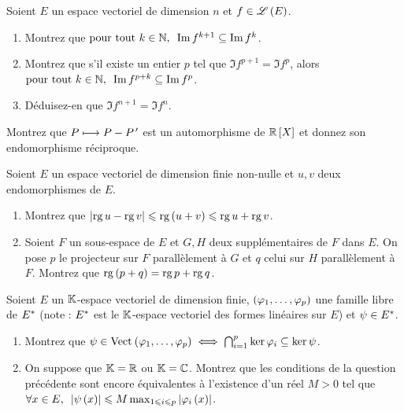 \begin{exo}
Soient \(E\) un espace vectoriel de dimension \(n\) et \(f\in\mathscr{L}\left(E\right)\).

\begin{enumerate}
    \item Montrez que \(\quantifs{\tpt k\in\N}\Im f^{k+1}\subset\Im f^k\). \\
    \item Montrez que s'il existe un entier \(p\) tel que \(\Im f^{p+1}=\Im f^p\), alors \(\quantifs{\tpt k\in\N}\Im f^{p+k}\subset\Im f^p\). \\
    \item Déduisez-en que \(\Im f^{n+1}=\Im f^n\).
\end{enumerate}
\end{exo}



\begin{exo}
Montrez que \(P\longmapsto P-P^{\,\prime}\) est un automorphisme de \(\poly[\R]\) et donnez son endomorphisme réciproque.
\end{exo}



\begin{exo}
Soient \(E\) un espace vectoriel de dimension finie non-nulle et \(u,v\) deux endomorphismes de \(E\).

\begin{enumerate}
    \item Montrez que \(\left\lvert\operatorname{rg} u-\operatorname{rg} v\right\rvert\leqslant\operatorname{rg}\left(u+v\right)\leqslant\operatorname{rg} u+\operatorname{rg} v\). \\
    \item Soient \(F\) un sous-espace de \(E\) et \(G,H\) deux supplémentaires de \(F\) dans \(E\). On pose \(p\) le projecteur sur \(F\) parallèlement à \(G\) et \(q\) celui sur \(H\) parallèlement à \(F\). Montrez que \(\operatorname{rg}\left(p+q\right)=\operatorname{rg} p+\operatorname{rg} q\).
\end{enumerate}
\end{exo}



\begin{exo}
Soient \(E\) un \(\mathbb{K}\)-espace vectoriel de dimension finie, \(\left(\varphi_1,\dots,\varphi_p\right)\) une famille libre de \(E^{*}\) (note : \(E^{*}\) est le \(\mathbb{K}\)-espace vectoriel des formes linéaires sur \(E\)) et \(\psi\in E^{*}\).

\begin{enumerate}
    \item Montrez que \(\psi\in\Vect{\phi_1,\dots,\phi_p}\ssi\biginter_{i=1}^p\ker\phi_i\subset\ker\psi\). \\
    \item On suppose que \(\mathbb{K}=\mathbb{R}\) ou \(\mathbb{K}=\mathbb{C}\). Montrez que les conditions de la question précédente sont encore équivalentes à l'existence d'un réel \(M>0\) tel que \(\quantifs{\forall x\in E}\abs{\psi\paren{x}}\leq M\max_{1\leq i\leq p}\abs{\phi_i\paren{x}}\).
\end{enumerate}
\end{exo}



